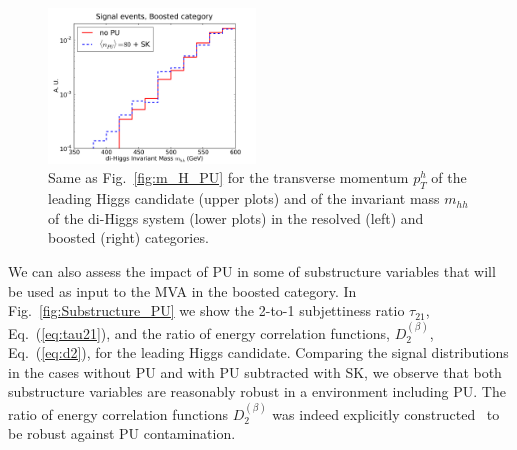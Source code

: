\begin{figure}[t]
\begin{center}
  \includegraphics[width=0.49\textwidth]{plots/m_HH_C2_bst_comp.pdf}
  \caption{\small
    Same as Fig.~\ref{fig:m_H_PU} for
   the transverse momentum $p_T^h$ of the leading
    Higgs candidate (upper plots) and of the invariant mass $m_{hh}$
    of the di-Higgs system (lower plots) in the resolved
    (left) and boosted (right) categories.
}
\label{fig:mHH_PU}
\end{center}
\end{figure}

We can also assess the impact of PU in some of
substructure variables that will be 
used as input to the MVA in the boosted category.
%
In Fig.~\ref{fig:Substructure_PU} we show the 2-to-1 subjettiness ratio
$\tau_{21}$, Eq.~(\ref{eq:tau21}), and the ratio
of energy correlation functions, $D_2^{(\beta)}$,
Eq.~(\ref{eq:d2}), for the leading Higgs candidate.
%
Comparing the signal distributions in the cases without PU and
with PU subtracted with SK, we observe that both substructure variables
are reasonably robust in a environment including PU.
%
The ratio of energy correlation functions $D_2^{(\beta)}$ 
was indeed explicitly constructed~\cite{Larkoski:2013eya}
to be robust against PU contamination.
%

